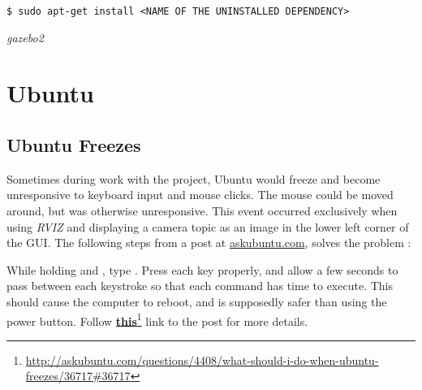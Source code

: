 \begin{verbatim}
$ sudo apt-get install <NAME OF THE UNINSTALLED DEPENDENCY>
\end{verbatim}

\textit{gazebo2} 

\section{Ubuntu}

\subsection{Ubuntu Freezes}

Sometimes during work with the project, Ubuntu would freeze and become unresponsive to keyboard input and mouse clicks. The mouse could be moved around, but was otherwise unresponsive. This event occurred exclusively when using \textit{RVIZ} and displaying a camera topic as an image in the lower left corner of the \ac{GUI}. The following steps from a post at \href{http://askubuntu.com/questions/4408/what-should-i-do-when-ubuntu-freezes/36717#36717}{askubuntu.com}, solves the problem \cite{Reboot_Ubuntu}:

While holding  and , type . Press each key properly, and allow a few seconds to pass between each keystroke so that each command has time to execute. This should cause the computer to reboot, and is supposedly safer than using the power button. Follow \href{http://askubuntu.com/questions/4408/what-should-i-do-when-ubuntu-freezes/36717#36717}{\textbf{this}}\footnote{\url{http://askubuntu.com/questions/4408/what-should-i-do-when-ubuntu-freezes/36717\#36717}} link to the post for more details.